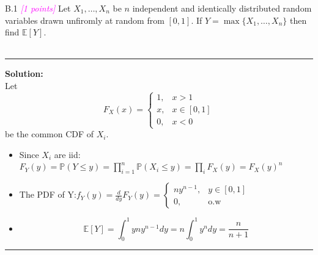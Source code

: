 \documentclass{article}
\newcommand{\1}{\mathbf{1}}
\newcommand{\E}{\mathbb{E}}
\renewcommand{\P}{\mathbb{P}}
\newcommand{\points}[1]{\small\textcolor{magenta}{\emph{[#1 points]}} \normalsize}
\begin{document}
B.1  \points{1} Let $X_1,\dots,X_n$ be $n$ independent and identically distributed random variables drawn unfiromly at random from $[0,1]$. If $Y = \max\{X_1,\dots,X_n\}$ then find $\E[Y]$.\\
\\
    \noindent\rule{\textwidth}{1pt}
    {\bf Solution:}\\
    Let $$F_X(x) = 
    \begin{cases}
    1, & x>1\\
    x, & x\in[0,1]\\
    0, & x<0
    \end{cases}
    $$ be the common CDF of $X_i$.
    \begin{itemize}
        \item Since $X_i$ are iid: $F_Y(y) = \P(Y \leq y) = \prod_{i=1}^n\P(X_i \le y) = \prod_i F_X(y) = F_X(y)^n$
        \item The PDF of Y:$f_Y(y) = \frac{d}{dy}F_Y(y) = \begin{cases}
    ny^{n-1}, & y\in[0,1]\\
    0, & \text{o.w}
    \end{cases}  $
    \item $$\boxed{\E[Y] = \int_0^1 yny^{n-1}dy = n\int_0^1 y^{n}dy = \frac{n}{n+1} }$$
    \end{itemize}
    \noindent\rule{\textwidth}{1pt}
\end{document}
